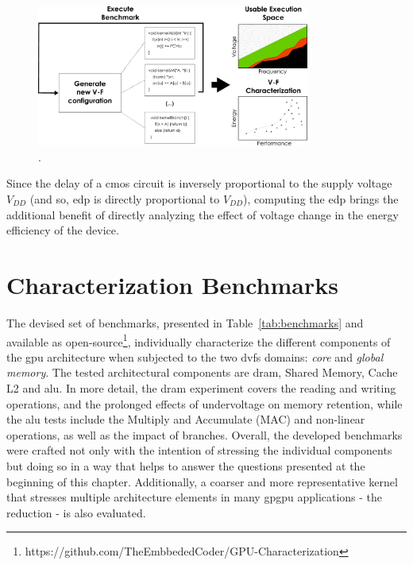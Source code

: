 \begin{figure}[htb]
  \centering
  \includegraphics[width=0.8\textwidth]{Figures/GPU_characterization/gpu_char.pdf}
  \caption{.}
  \label{fig:gpu_char}
\end{figure}

Since the delay of a \acrshort{cmos} circuit is inversely proportional to the supply voltage $V_{DD}$ (and so, \acrshort{edp} is directly proportional to $V_{DD}$), computing the \acrshort{edp} brings the additional benefit of directly analyzing the effect of voltage change in the energy efficiency of the device.


\section{Characterization Benchmarks}
\label{sec:char_meth}

The devised set of benchmarks,  presented in Table~\ref{tab:benchmarks} and available as open-source\footnote{https://github.com/TheEmbbededCoder/GPU-Characterization}, individually characterize the different components of the \acrshort{gpu} architecture when subjected to the two \acrshort{dvfs} domains: \textit{core} and \textit{global memory}. The tested architectural components are \acrshort{dram}, Shared Memory, Cache L2 and \acrshort{alu}. In more detail, the \acrshort{dram} experiment covers the reading and writing operations, and the prolonged effects of undervoltage on memory retention, while the \acrshort{alu} tests include the Multiply and Accumulate (MAC) and non-linear operations, as well as the impact of branches. Overall, the developed benchmarks were crafted not only with the intention of stressing the individual components but doing so in a way that helps to answer the questions presented at the beginning of this chapter. Additionally, a coarser and more representative kernel that stresses multiple architecture elements in many \acrshort{gpgpu} applications - the reduction - is also evaluated.


